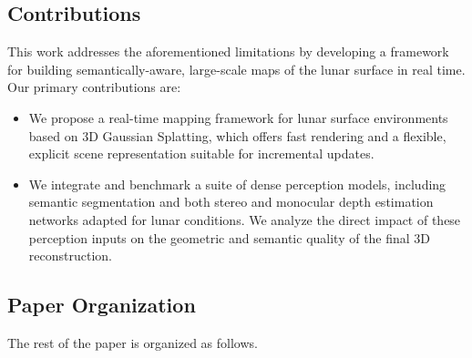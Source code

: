 \subsection{Contributions}
This work addresses the aforementioned limitations by developing a framework for building semantically-aware, large-scale maps of the lunar surface in real time. Our primary contributions are:
\begin{itemize}
	\item We propose a real-time mapping framework for lunar surface environments based on 3D Gaussian Splatting, which offers fast rendering and a flexible, explicit scene representation suitable for incremental updates.
	\item We integrate and benchmark a suite of dense perception models, including semantic segmentation and both stereo and monocular depth estimation networks adapted for lunar conditions. We analyze the direct impact of these perception inputs on the geometric and semantic quality of the final 3D reconstruction.
\end{itemize}


\subsection{Paper Organization}
The rest of the paper is organized as follows.


